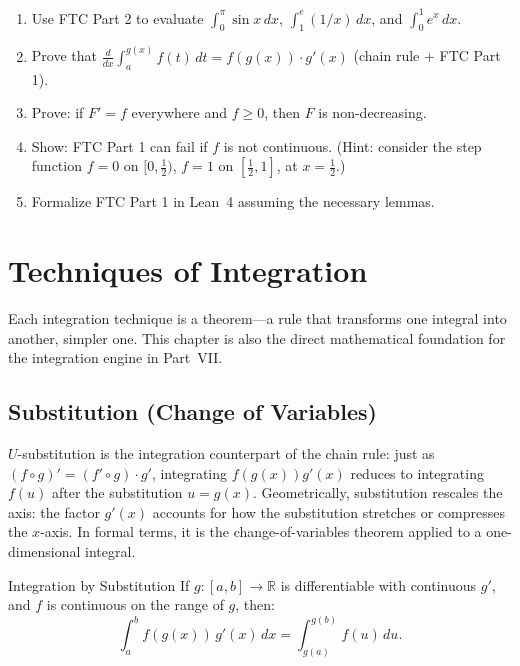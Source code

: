 \documentclass[12pt, openany]{book}
\theoremstyle{plain}
\theoremstyle{definition}
\theoremstyle{remark}
\newcommand{\R}{\mathbb{R}}
\begin{document}
\begin{exbox}
\begin{enumerate}
  \item Use FTC Part 2 to evaluate $\int_0^\pi \sin x\,dx$, $\int_1^e (1/x)\,dx$, and $\int_0^1 e^x\,dx$.
  \item Prove that $\frac{d}{dx}\int_a^{g(x)} f(t)\,dt = f(g(x)) \cdot g'(x)$ (chain rule + FTC Part 1).
  \item Prove: if $F' = f$ everywhere and $f \geq 0$, then $F$ is non-decreasing.
  \item Show: FTC Part 1 can fail if $f$ is not continuous. (Hint: consider the step function $f = 0$ on $[0,\tfrac12)$, $f = 1$ on $[\tfrac12,1]$, at $x = \tfrac12$.)
  \item Formalize FTC Part 1 in Lean~4 assuming the necessary lemmas.
\end{enumerate}
\end{exbox}
\color{black}

\chapter{Techniques of Integration}
\color{black}

Each integration technique is a theorem---a rule that transforms one integral into another, simpler one. This chapter is also the direct mathematical foundation for the integration engine in Part~VII.

\section{Substitution (Change of Variables)}

$U$-substitution is the integration counterpart of the chain rule: just as $(f \circ g)' = (f' \circ g) \cdot g'$, integrating $f(g(x)) g'(x)$ reduces to integrating $f(u)$ after the substitution $u = g(x)$.  Geometrically, substitution rescales the axis: the factor $g'(x)$ accounts for how the substitution stretches or compresses the $x$-axis.  In formal terms, it is the change-of-variables theorem applied to a one-dimensional integral.

\begin{thmbox}{Integration by Substitution}
If $g : [a,b] \to \R$ is differentiable with continuous $g'$, and $f$ is continuous on the range of $g$, then:
\[ \int_a^b f(g(x))\,g'(x)\,dx = \int_{g(a)}^{g(b)} f(u)\,du. \]
\end{thmbox}
\color{black}
\end{document}
